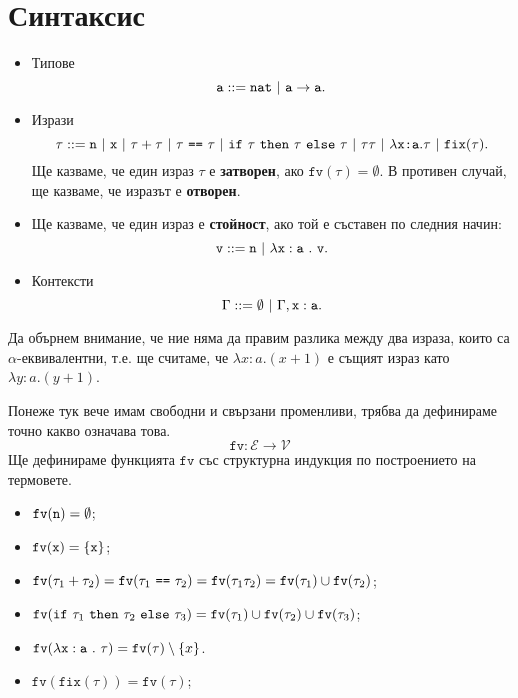 \section{Синтаксис}

\newcommand{\fix}{\texttt{fix}}
\newcommand{\fv}{\texttt{fv}}

\begin{itemize}
\item
  Типове
  \[\vv{a} ::= \vv{nat}\ |\ \vv{a} \to \vv{a}.\]
\item
  Изрази
  \[\tau ::= \vv{n}\ |\ \vv{x}\ |\ \tau + \tau\ |\ \tau\ \vv{==}\ \tau\ |\ \ifelse{\tau}{\tau}{\tau}\ |\ \tau\tau\ |\ \lambda \vv{x:a}.\tau\ |\ \fix(\tau).\]
  Ще казваме, че един израз $\tau$ е {\bf затворен}, ако $\fv(\tau) = \emptyset$.
  В противен случай, ще казваме, че изразът е {\bf отворен}.
\item
  Ще казваме, че един израз е {\bf стойност}, ако той е съставен по следния начин:
  \[\vv{v} ::= \vv{n}\ |\ \lambda\type{x}{a}\ .\ \vv{v}.\]
\item
  Контексти
  \[\Gamma ::= \emptyset\ |\ \Gamma,\type{x}{a}.\]
\end{itemize}

Да обърнем внимание, че ние няма да правим разлика между два израза, които са $\alpha$-еквивалентни, т.е.
ще считаме, че $\lambda x:a. (x+1)$ е същият израз като $\lambda y:a. (y+1)$.

Понеже тук вече имам свободни и свързани променливи, трябва да дефинираме точно какво означава това.
\[\fv:\mathcal{E} \to \mathcal{V}\]
Ще дефинираме функцията $\texttt{fv}$ със структурна индукция по построението на термовете.

\begin{itemize}
\item
  $\fv(\vv{n}) = \emptyset$;
\item
  $\fv(\vv{x}) = \{\vv{x}\}$;
\item
  $\fv(\tau_1 + \tau_2) = \fv(\tau_1\ \vv{==}\ \tau_2) = \fv(\tau_1\tau_2) = \fv(\tau_1) \cup \fv(\tau_2)$;
\item
  $\fv(\ifelse{\tau_1}{\tau_2}{\tau_3}) = \fv(\tau_1) \cup \fv(\tau_2) \cup \fv(\tau_3)$;
\item
  $\fv(\lambda \type{x}{a}\ .\ \tau) = \fv(\tau) \setminus \{x\}$.
\item
  $\fv(\fix(\tau)) = \fv(\tau)$;
\end{itemize}



